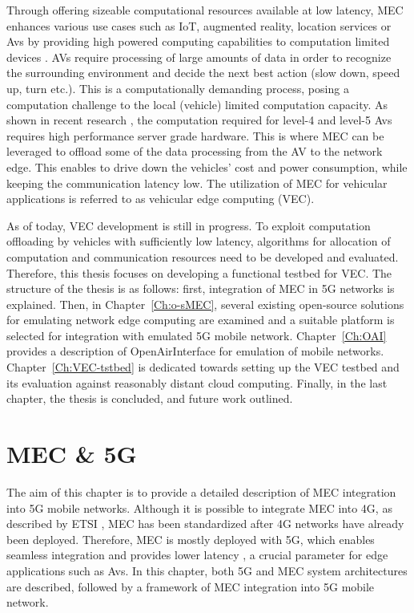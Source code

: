 \documentclass[12pt,a4paper,twoside]{report}
\begin{document}
Through offering sizeable computational resources available at low latency, MEC enhances various use cases such as IoT, augmented reality, location services or Avs by providing high powered computing capabilities to computation limited devices \cite{mec-etsi-web}. AVs require processing of large amounts of data in order to recognize the surrounding environment and decide the next best action (slow down, speed up, turn etc.). This is a computationally demanding process, posing a computation challenge to the local (vehicle) limited computation capacity. As shown in recent research \cite{zhao2019towards}, the computation required for level-4 and level-5 Avs requires high performance server grade hardware. This is where MEC can be leveraged to offload some of the data processing from the AV to the network edge. This enables to drive down the vehicles’ cost and power consumption, while keeping the communication latency low. The utilization of MEC for vehicular applications is referred to as vehicular edge computing (VEC). 

As of today, VEC development is still in progress. To exploit computation offloading by vehicles with sufficiently low latency, algorithms for allocation of computation and communication resources need to be developed and evaluated. Therefore, this thesis focuses on developing a functional testbed for VEC. The structure of the thesis is as follows: first, integration of MEC in 5G networks is explained. Then, in Chapter~\ref{Ch:o-sMEC}, several existing open-source solutions for emulating network edge computing are examined and a suitable platform is selected for integration with emulated 5G mobile network. Chapter~\ref{Ch:OAI} provides a description of OpenAirInterface for emulation of mobile networks. Chapter~\ref{Ch:VEC-tstbed} is dedicated towards setting up the VEC testbed and its evaluation against reasonably distant cloud computing. Finally, in the last chapter, the thesis is concluded, and future work outlined.
\chapter{MEC \& 5G}
\label{Ch:MECn5G}
The aim of this chapter is to provide a detailed description of MEC integration into 5G mobile networks. Although it is possible to integrate MEC into 4G, as described by ETSI \cite{ETSI:wp24}, MEC has been standardized after 4G networks have already been deployed. Therefore, MEC is mostly deployed with 5G, which enables seamless integration \cite{ETSI:wp28} and provides lower latency \cite{dahlman-2020-5g}, a crucial parameter for edge applications such as Avs.  In this chapter, both 5G and MEC system architectures are described, followed by a framework of MEC integration into 5G mobile network.
\end{document}
